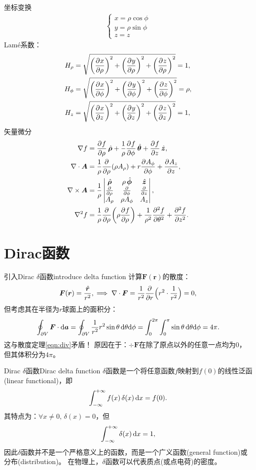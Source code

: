 坐标变换
\begin{align}
    \begin{cases}
        x=\rho\cos\phi\\
        y=\rho\sin\phi\\
        z=z
    \end{cases}
\end{align}
Lam\'e系数：
\begin{subequations}
    \begin{align}
        H_\rho&=\sqrt{\biggkh{\pv x\rho}^2+\biggkh{\pv y\rho}^2+\biggkh{\pv z\rho}^2}=1,\\
        H_\phi&=\sqrt{\biggkh{\pv x\phi}^2+\biggkh{\pv y\phi}^2+\biggkh{\pv z\phi}^2}=\rho,\\
        H_z&=\sqrt{\biggkh{\pv xz}^2+\biggkh{\pv yz}^2+\biggkh{\pv zz}^2}=1,
    \end{align}
\end{subequations}
矢量微分
\begin{align}
    \nabla f&=\pv f\rho\uvec\rho+\frac1\rho\pv f\phi\uvec\theta+\pv fz\uvec z,\\
    \div\bm A&=\frac1\rho\pp\rho(\rho A_\rho)+r\pv{A_\phi}\phi+\pv{A_z}z,\\
    \curl\bm A&=\frac1\rho
    \begin{vmatrix}
        \uvec\rho&\rho\uvec\phi&\uvec z\\
        \pp\rho&\pp\phi&\pp z\\
        A_\rho&\rho A_\phi&A_z
    \end{vmatrix},\\
    \lap f&=\frac1\rho\pp\rho\biggkh{\rho\pv f\rho}+\frac1{\rho^2}\pv[2]f\theta+\pv[2]fz.
\end{align}

\section{Dirac函数}

\begin{example}{引入Dirac $\delta$函数}{introduce delta function}
    计算$\bm F(\bm r)$的散度：
    \[
        \bm F(\bm r)=\frac{\uvec r}{r^2},\implies\div\bm F=\frac1{r^2}\pp r\Bigkh{r^2\cdot\frac1{r^2}}=0,
    \]
    但考虑其在半径为$r$球面上的面积分：
    \[
        \oint_{\p V}\bm F\cdot\d\bm a=\oint_{\p V}\frac1{r^2}r^2\sin\theta\d\theta\nd\phi=\int_0^{2\pi}\int_0^\pi\sin\theta\d\theta\nd\phi=4\pi.
    \]
    这与散度定理\eqref{eqn:div}矛盾！
    原因在于：$\div\bm F$在除了原点以外的任意一点均为0，但其体积分为$4\pi$。
\end{example}
\begin{definition}{Dirac $\delta$函数}{Dirac delta function}
    $\delta$函数是一个将任意函数$f$映射到$f(0)$的线性泛函(linear functional)，即
    \[
        \int\iti f(x)\vd(x)\d x=f(0).
    \]
    其特点为：$\forall x\neq 0,\,\delta(x)=0$，但
    \[
        \int\iti\delta(x)\d x=1,
    \]
    因此$\delta$函数并不是一个严格意义上的函数，而是一个广义函数(general function)或分布(distribution)。
    在物理上，$\delta$函数可以代表质点(或点电荷)的密度。
\end{definition}

